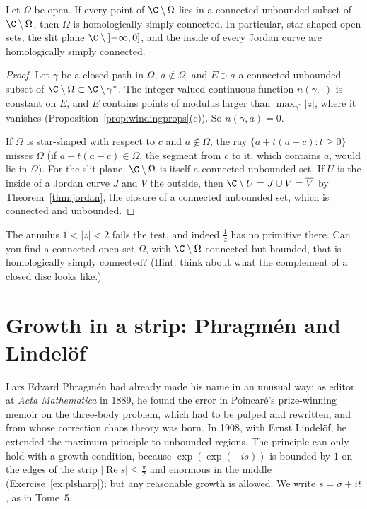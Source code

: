 \begin{proposition}\label{prop:hsccriterion}
Let $\Omega$ be open. If every point of $\C\setminus\Omega$ lies in a connected unbounded subset of $\C\setminus\Omega$, then $\Omega$ is homologically simply connected. In particular, star-shaped open sets,
the slit plane $\C\setminus\left]-\infty,0\right]$, and the inside of every Jordan curve are homologically simply connected.
\end{proposition}
\begin{proof}
Let $\gamma$ be a closed path in $\Omega$, $a\notin\Omega$, and $E\ni a$ a connected unbounded subset of $\C\setminus\Omega\subset\C\setminus\gamma^*$. The integer-valued continuous function $n(\gamma,\cdot)$ is constant
on $E$, and $E$ contains points of modulus larger than $\max_{\gamma^*}|z|$, where it vanishes (Proposition~\ref{prop:windingprops}(c)). So $n(\gamma,a)=0$.

If $\Omega$ is star-shaped with respect to $c$ and $a\notin\Omega$, the ray $\{a+t(a-c):t\ge0\}$ misses $\Omega$ (if $a+t(a-c)\in\Omega$, the segment from $c$ to it, which contains $a$, would lie in $\Omega$). For the
slit plane, $\C\setminus\Omega$ is itself a connected unbounded set. If $U$ is the inside of a Jordan curve $J$ and $V$ the outside, then $\C\setminus U=J\cup V=\overline V$ by Theorem~\ref{thm:jordan}, the
closure of a connected unbounded set, which is connected and unbounded.
\end{proof}

\begin{think}
The annulus $1<|z|<2$ fails the test, and indeed $\frac1z$ has no primitive there. Can you find a connected open set $\Omega$, with $\C\setminus\Omega$ connected but bounded, that is
homologically simply connected? (Hint: think about what the complement of a closed disc looks like.)
\end{think}

\section{Growth in a strip: Phragm\'en and Lindel\"of}

Lars Edvard Phragm\'en had already made his name in an unusual way: as editor at \emph{Acta Mathematica} in 1889, he found the error in Poincar\'e's prize-winning memoir on the three-body problem,
which had to be pulped and rewritten, and from whose correction chaos theory was born. In 1908, with Ernst Lindel\"of, he extended the maximum principle to unbounded regions. The principle can only
hold with a growth condition, because $\exp(\exp(-is))$ is bounded by $1$ on the edges of the strip $|\operatorname{Re}s|\le\frac\pi2$ and enormous in the middle (Exercise~\ref{ex:plsharp}); but any reasonable growth
is allowed. We write $s=\sigma+it$, as in Tome~5.

